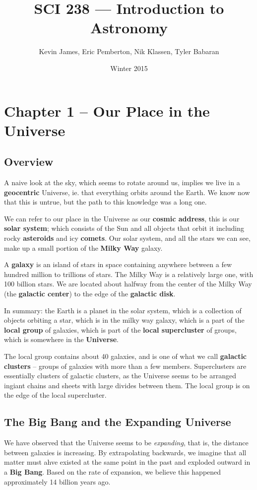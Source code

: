 \documentclass[12pt]{article}
\begin{document}
\title{SCI 238 --- Introduction to Astronomy}
\author{Kevin James, Eric Pemberton, Nik Klassen, Tyler Babaran}
\date{\vspace{-2ex}Winter 2015}
\maketitle\HRule

\tableofcontents
\newpage

\section{Chapter 1 -- Our Place in the Universe}
\subsection{Overview}
A naive look at the sky, which seems to rotate around us, implies we live in a {\bf geocentric} Universe, ie. that everything orbits around the Earth. We know now that this is untrue, but the path to this knowledge was a long one.

We can refer to our place in the Universe as our {\bf cosmic address}, this is our {\bf solar system}; which consists of the Sun and all objects that orbit it including rocky {\bf asteroids} and icy {\bf comets}. Our solar system, and all the stars we can see, make up a small portion of the {\bf Milky Way} galaxy.

A {\bf galaxy} is an island of stars in space containing anywhere between a few hundred million to trillions of stars. The Milky Way is a relatively large one, with 100 billion stars. We are located about halfway from the center of the Milky Way (the {\bf galactic center}) to the edge of the {\bf galactic disk}.

In summary: the Earth is a planet in the solar system, which is a collection of objects orbiting a star, which is in the milky way galaxy, which is a part of the {\bf local group} of galaxies, which is part of the {\bf local supercluster} of groups, which is somewhere in the {\bf Universe}.

The local group contains about 40 galaxies, and is one of what we call {\bf galactic clusters} -- groups of galaxies with more than a few members. Superclusters are essentially clusters of galactic clusters, as the Universe seems to be arranged ingiant chains and sheets with large divides between them. The local group is on the edge of the local supercluster.

\subsection{The Big Bang and the Expanding Universe}
We have observed that the Universe seems to be \emph{expanding}, that is, the distance between galaxies is increasing. By extrapolating backwards, we imagine that all matter must ahve existed at the same point in the past and exploded outward in a {\bf Big Bang}. Based on the rate of expansion, we believe this happened approximately 14 billion years ago.
\end{document}
